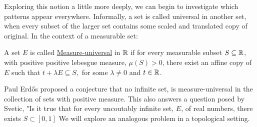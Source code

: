 Exploring this notion a little more deeply, we can begin to investigate which patterns appear everywhere.  Informally, a set is called universal in another set, when every subset of the larger set contains some scaled and translated copy of original.  In the context of a measurable set:

\begin{definition}
    A set $E$ is called \underline{Measure-universal} in $\mathbb{R}$ if for every measurable subset $S \subseteq \mathbb{R}$, with positive positive lebesgue measure, $\mu (S) > 0$, there exist an affine copy of $E$ such that $t+\lambda E \subseteq S,$ for some $\lambda \neq 0$ and $t \in \mathbb{R}$.  
\end{definition}
  Paul Erd\H{o}s proposed a conjecture that no infinite set, is measure-universal in  the collection of sets with positive measure.  This also answers a question posed by Svetic, "Is it true that for every uncoutably infinite set, $E$, of real numbers, there exists $S \subset [0,1]$ We will explore an analogous problem in a topological setting. 






